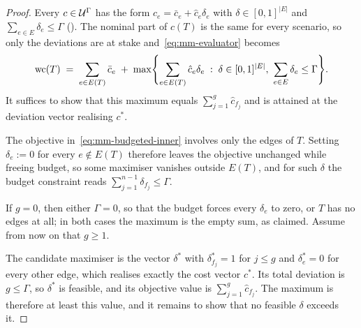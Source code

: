 \begin{proof}
Every $c \in \mathcal{U}^{\Gamma}$ has the form $c_e = \bar{c}_e + \hat{c}_e \delta_e$ with $\delta \in [0,1]^{|E|}$ and $\sum_{e \in E} \delta_e \leq \Gamma$ ().
The nominal part of $c(T)$ is the same for every scenario, so only the deviations are at stake and~\eqref{eq:mm-evaluator} becomes
\begin{equation}\label{eq:mm-budgeted-inner}
\mathrm{wc}(T) \;=\; \sum_{e \in E(T)} \bar{c}_e \;+\; \max\Biggl\{ \sum_{e \in E(T)} \hat{c}_e \delta_e \;:\; \delta \in [0,1]^{|E|},\ \sum_{e \in E} \delta_e \leq \Gamma \Biggr\}.
\end{equation}
It suffices to show that this maximum equals $\sum_{j=1}^{g} \hat{c}_{f_j}$ and is attained at the deviation vector realising $c^{*}$.

The objective in~\eqref{eq:mm-budgeted-inner} involves only the edges of $T$.
Setting $\delta_e := 0$ for every $e \notin E(T)$ therefore leaves the objective unchanged while freeing budget, so some maximiser vanishes outside $E(T)$, and for such $\delta$ the budget constraint reads $\sum_{j=1}^{n-1} \delta_{f_j} \leq \Gamma$.

If $g = 0$, then either $\Gamma = 0$, so that the budget forces every $\delta_e$ to zero, or $T$ has no edges at all; in both cases the maximum is the empty sum, as claimed.
Assume from now on that $g \geq 1$.

The candidate maximiser is the vector $\delta^{*}$ with $\delta^{*}_{f_j} = 1$ for $j \leq g$ and $\delta^{*}_e = 0$ for every other edge, which realises exactly the cost vector $c^{*}$.
Its total deviation is $g \leq \Gamma$, so $\delta^{*}$ is feasible, and its objective value is $\sum_{j=1}^{g} \hat{c}_{f_j}$.
The maximum is therefore at least this value, and it remains to show that no feasible $\delta$ exceeds it.


\end{proof}
